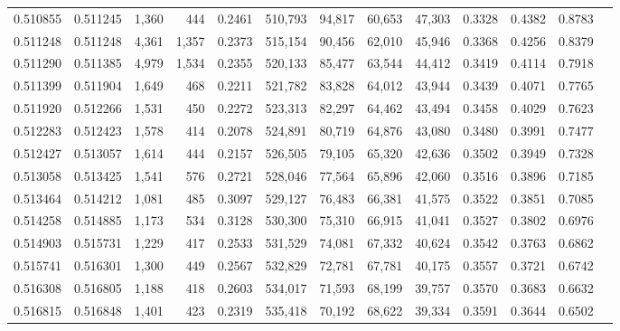 \begin{tabular}{rrrrrrrrrrrrr}
0.510855 & 0.511245 &  1,360 &   444 &                                     0.2461 & 510,793 &  94,817 &  60,653 &  47,303 & 0.3328 & 0.4382 & 0.8783 \\
0.511248 & 0.511248 &  4,361 & 1,357 &                                     0.2373 & 515,154 &  90,456 &  62,010 &  45,946 & 0.3368 & 0.4256 & 0.8379 \\
0.511290 & 0.511385 &  4,979 & 1,534 &                                     0.2355 & 520,133 &  85,477 &  63,544 &  44,412 & 0.3419 & 0.4114 & 0.7918 \\
0.511399 & 0.511904 &  1,649 &   468 &                                     0.2211 & 521,782 &  83,828 &  64,012 &  43,944 & 0.3439 & 0.4071 & 0.7765 \\
0.511920 & 0.512266 &  1,531 &   450 &                                     0.2272 & 523,313 &  82,297 &  64,462 &  43,494 & 0.3458 & 0.4029 & 0.7623 \\
0.512283 & 0.512423 &  1,578 &   414 &                                     0.2078 & 524,891 &  80,719 &  64,876 &  43,080 & 0.3480 & 0.3991 & 0.7477 \\
0.512427 & 0.513057 &  1,614 &   444 &                                     0.2157 & 526,505 &  79,105 &  65,320 &  42,636 & 0.3502 & 0.3949 & 0.7328 \\
0.513058 & 0.513425 &  1,541 &   576 &                                     0.2721 & 528,046 &  77,564 &  65,896 &  42,060 & 0.3516 & 0.3896 & 0.7185 \\
0.513464 & 0.514212 &  1,081 &   485 &                                     0.3097 & 529,127 &  76,483 &  66,381 &  41,575 & 0.3522 & 0.3851 & 0.7085 \\
0.514258 & 0.514885 &  1,173 &   534 &                                     0.3128 & 530,300 &  75,310 &  66,915 &  41,041 & 0.3527 & 0.3802 & 0.6976 \\
0.514903 & 0.515731 &  1,229 &   417 &                                     0.2533 & 531,529 &  74,081 &  67,332 &  40,624 & 0.3542 & 0.3763 & 0.6862 \\
0.515741 & 0.516301 &  1,300 &   449 &                                     0.2567 & 532,829 &  72,781 &  67,781 &  40,175 & 0.3557 & 0.3721 & 0.6742 \\
0.516308 & 0.516805 &  1,188 &   418 &                                     0.2603 & 534,017 &  71,593 &  68,199 &  39,757 & 0.3570 & 0.3683 & 0.6632 \\
0.516815 & 0.516848 &  1,401 &   423 &                                     0.2319 & 535,418 &  70,192 &  68,622 &  39,334 & 0.3591 & 0.3644 & 0.6502 \\

\end{tabular}
